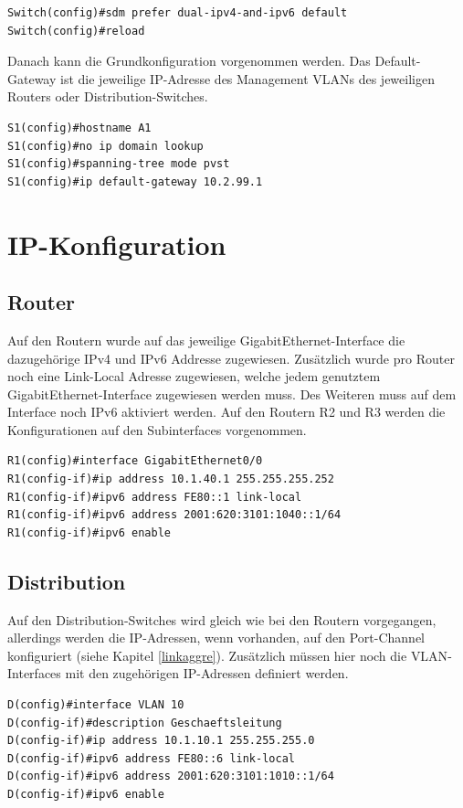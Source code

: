 \documentclass[11pt,a4paper]{scrreprt}
\begin{document}
\begin{lstlisting}[frame=single, captionpos=b,caption= Switch Template Wechsel]
Switch(config)#sdm prefer dual-ipv4-and-ipv6 default
Switch(config)#reload
\end{lstlisting}
\noindent
Danach kann die Grundkonfiguration vorgenommen werden. Das Default-Gateway ist die jeweilige IP-Adresse des Management \acs{VLAN}s des jeweiligen Routers oder Distribution-Switches.
\newline

\begin{lstlisting}[frame=single, captionpos=b,caption= Switch Grund Konfiguration]
S1(config)#hostname A1
S1(config)#no ip domain lookup
S1(config)#spanning-tree mode pvst
S1(config)#ip default-gateway 10.2.99.1
\end{lstlisting}
\newpage
\section{IP-Konfiguration}
\subsection{Router}
Auf den Routern wurde auf das jeweilige GigabitEthernet-Interface die dazugehörige IPv4 und IPv6 Addresse zugewiesen. Zusätzlich wurde pro Router noch eine Link-Local Adresse zugewiesen, welche jedem genutztem GigabitEthernet-Interface zugewiesen werden muss. Des Weiteren muss auf dem Interface noch IPv6 aktiviert werden.
Auf den Routern R2 und R3 werden die Konfigurationen auf den Subinterfaces vorgenommen.
\newline
\begin{lstlisting}[frame=single, captionpos=b,caption= Router IP-Konfiguration]
R1(config)#interface GigabitEthernet0/0
R1(config-if)#ip address 10.1.40.1 255.255.255.252
R1(config-if)#ipv6 address FE80::1 link-local
R1(config-if)#ipv6 address 2001:620:3101:1040::1/64
R1(config-if)#ipv6 enable
\end{lstlisting}

\subsection{Distribution}
Auf den Distribution-Switches wird gleich wie bei den Routern vorgegangen, allerdings werden die IP-Adressen, wenn vorhanden, auf den Port-Channel konfiguriert (siehe Kapitel \ref{linkaggre}). Zusätzlich müssen hier noch die \acs{VLAN}-Interfaces mit den zugehörigen IP-Adressen definiert werden.
\newline
\begin{lstlisting}[frame=single, captionpos=b,caption= Distribution IP-Konfiguration]
D(config)#interface VLAN 10
D(config-if)#description Geschaeftsleitung
D(config-if)#ip address 10.1.10.1 255.255.255.0
D(config-if)#ipv6 address FE80::6 link-local
D(config-if)#ipv6 address 2001:620:3101:1010::1/64
D(config-if)#ipv6 enable
\end{lstlisting}
\end{document}
